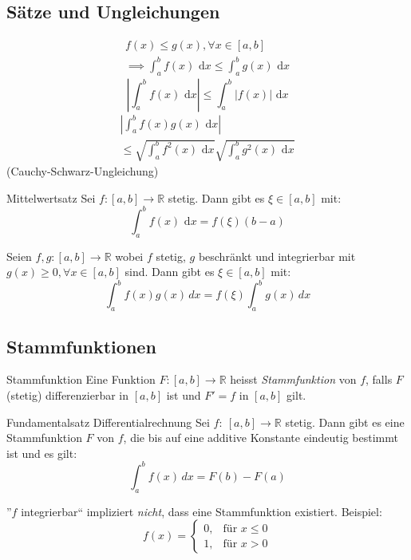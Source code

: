 \documentclass[a4paper,10pt]{article}
\def\R{\mathbb{R}}
\def\dx{\text{ d}x}
\begin{document}
\subsection{Sätze und Ungleichungen}
\begin{multline*}
    f(x) \le g(x), \forall x \in [a,b] \\
    \implies \int_a^b f(x) \dx \le \int_a^b g(x) \dx
\end{multline*}
\[
    \left|\int_a^b f(x) \dx\right|
    \le \int_a^b |f(x)| \dx
\]
\begin{multline*}
    \left|\int_a^b f(x) g(x) \dx \right| \\
    \le \sqrt{\int_a^b f^2(x) \dx} \sqrt{\int_a^b g^2(x) \dx}
\end{multline*}
(Cauchy-Schwarz-Ungleichung)

\begin{mainbox}{Mittelwertsatz}
 Sei $f: [a,b] \to \R$ stetig. Dann gibt es $\xi \in [a,b]$ mit:
 \[ \int_a^b f(x) \dx = f(\xi) (b-a) \]
\end{mainbox}
Seien $f,g: [a,b] \to \R$ wobei $f$ stetig, $g$ beschränkt und integrierbar mit $g(x) \ge 0, \forall x \in [a,b]$ sind. Dann gibt es $\xi \in [a,b]$ mit:
\[ \int_a^b f(x)g(x) \, dx = f(\xi) \int_a^b g(x) \, dx \]

\subsection{Stammfunktionen}
\begin{subbox}{Stammfunktion}
 Eine Funktion $F: [a,b] \to \R$ heisst \emph{Stammfunktion} von $f$, falls $F$ (stetig) differenzierbar in $[a,b]$ ist und $F' = f$ in $\left[a,b\right]$ gilt.
\end{subbox}
\begin{subbox}{Fundamentalsatz Differentialrechnung}
Sei $f: \: [a, b] \to \R$ stetig. Dann gibt es eine Stammfunktion $F$ von $f$, die bis auf eine additive Konstante eindeutig bestimmt ist und es gilt:
\[ \int_a^b f(x) \, dx = F(b) - F(a) \]
\end{subbox}
''$f$ integrierbar`` impliziert \textit{nicht}, dass eine Stammfunktion existiert. Beispiel:
$$
 f(x) = \begin{cases}
        0, & \text{für } x \le 0 \\
        1, & \text{für } x > 0
        \end{cases}
$$
\end{document}
